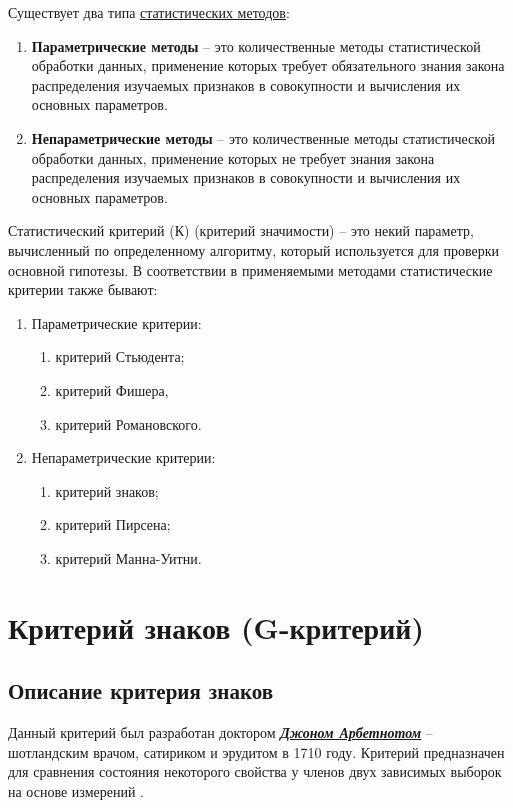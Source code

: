 \documentclass[12pt]{article}
\begin{document}
\medskip
Существует два типа \href{https://www.vsavm.by/knigi/kniga3/780.html}{статистических методов}:
\begin{enumerate}
    \item \textbf{Параметрические методы} – это количественные методы статистической обработки данных, применение которых требует обязательного знания закона распределения изучаемых признаков в совокупности и вычисления их основных параметров.
    \item \textbf{Непараметрические методы} – это количественные методы статистической обработки данных, применение которых не требует знания закона распределения изучаемых признаков в совокупности и вычисления их основных параметров.
\end{enumerate}
Статистический критерий (К) (критерий значимости) – это некий параметр, вычисленный по определенному алгоритму, который используется для проверки основной гипотезы. В соответствии в применяемыми методами статистические критерии также бывают:
\begin{enumerate}
    \item Параметрические критерии:
    \begin{enumerate}
        \item критерий Стьюдента;
        \item критерий Фишера,
        \item критерий Романовского.
    \end{enumerate}
    \item Непараметрические критерии:
    \begin{enumerate}
        \item критерий знаков;
        \item критерий Пирсена;
        \item критерий Манна-Уитни.
    \end{enumerate}
\end{enumerate}

\section{Критерий знаков (G-критерий)}

\medskip
\subsection{Описание критерия знаков}

\medskip
Данный критерий был разработан доктором \href{https://ru.wikipedia.org/wiki/John_Arbuthnot}{\textbf{\textit{Джоном Арбетнотом}}} – шотландским врачом, сатириком и эрудитом в 1710 году. Критерий предназначен для сравнения состояния некоторого свойства у членов двух зависимых выборок на основе измерений \cite{3}.
\end{document}
